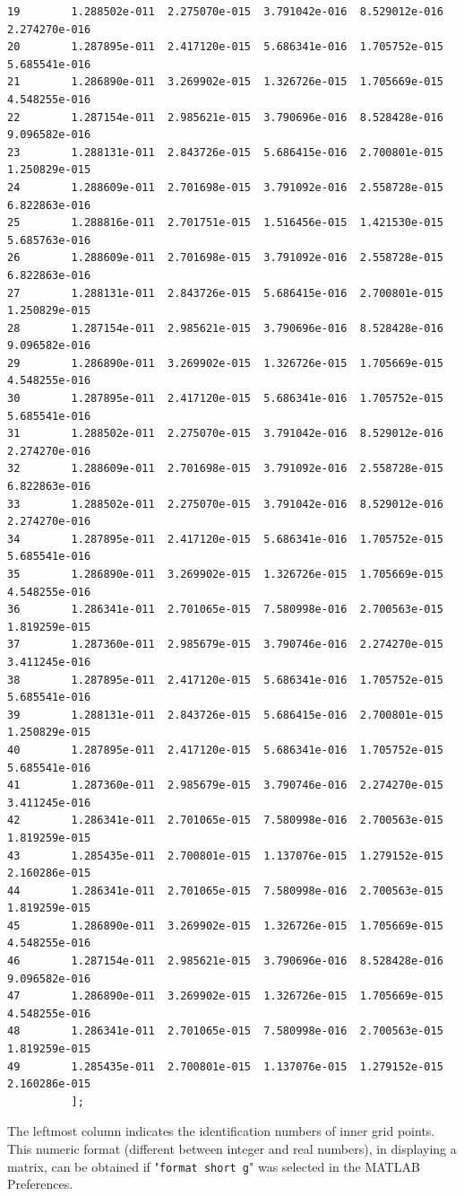\documentclass[a4paper,10pt]{report}%
\begin{document}
\begin{lstlisting}
19        1.288502e-011  2.275070e-015  3.791042e-016  8.529012e-016  2.274270e-016
20        1.287895e-011  2.417120e-015  5.686341e-016  1.705752e-015  5.685541e-016
21        1.286890e-011  3.269902e-015  1.326726e-015  1.705669e-015  4.548255e-016
22        1.287154e-011  2.985621e-015  3.790696e-016  8.528428e-016  9.096582e-016
23        1.288131e-011  2.843726e-015  5.686415e-016  2.700801e-015  1.250829e-015
24        1.288609e-011  2.701698e-015  3.791092e-016  2.558728e-015  6.822863e-016
25        1.288816e-011  2.701751e-015  1.516456e-015  1.421530e-015  5.685763e-016
26        1.288609e-011  2.701698e-015  3.791092e-016  2.558728e-015  6.822863e-016
27        1.288131e-011  2.843726e-015  5.686415e-016  2.700801e-015  1.250829e-015
28        1.287154e-011  2.985621e-015  3.790696e-016  8.528428e-016  9.096582e-016
29        1.286890e-011  3.269902e-015  1.326726e-015  1.705669e-015  4.548255e-016
30        1.287895e-011  2.417120e-015  5.686341e-016  1.705752e-015  5.685541e-016
31        1.288502e-011  2.275070e-015  3.791042e-016  8.529012e-016  2.274270e-016
32        1.288609e-011  2.701698e-015  3.791092e-016  2.558728e-015  6.822863e-016
33        1.288502e-011  2.275070e-015  3.791042e-016  8.529012e-016  2.274270e-016
34        1.287895e-011  2.417120e-015  5.686341e-016  1.705752e-015  5.685541e-016
35        1.286890e-011  3.269902e-015  1.326726e-015  1.705669e-015  4.548255e-016
36        1.286341e-011  2.701065e-015  7.580998e-016  2.700563e-015  1.819259e-015
37        1.287360e-011  2.985679e-015  3.790746e-016  2.274270e-015  3.411245e-016
38        1.287895e-011  2.417120e-015  5.686341e-016  1.705752e-015  5.685541e-016
39        1.288131e-011  2.843726e-015  5.686415e-016  2.700801e-015  1.250829e-015
40        1.287895e-011  2.417120e-015  5.686341e-016  1.705752e-015  5.685541e-016
41        1.287360e-011  2.985679e-015  3.790746e-016  2.274270e-015  3.411245e-016
42        1.286341e-011  2.701065e-015  7.580998e-016  2.700563e-015  1.819259e-015
43        1.285435e-011  2.700801e-015  1.137076e-015  1.279152e-015  2.160286e-015
44        1.286341e-011  2.701065e-015  7.580998e-016  2.700563e-015  1.819259e-015
45        1.286890e-011  3.269902e-015  1.326726e-015  1.705669e-015  4.548255e-016
46        1.287154e-011  2.985621e-015  3.790696e-016  8.528428e-016  9.096582e-016
47        1.286890e-011  3.269902e-015  1.326726e-015  1.705669e-015  4.548255e-016
48        1.286341e-011  2.701065e-015  7.580998e-016  2.700563e-015  1.819259e-015
49        1.285435e-011  2.700801e-015  1.137076e-015  1.279152e-015  2.160286e-015
          ];
\end{lstlisting}
The leftmost column indicates the identification numbers of inner grid points.
This numeric format (different between integer and real numbers), in displaying a matrix, can be obtained if
"{\tt format short g}" was selected in the MATLAB Preferences.
\end{document}
